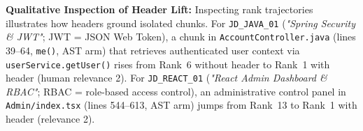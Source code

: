 \textbf{Qualitative Inspection of Header Lift:} Inspecting rank trajectories illustrates how headers ground isolated chunks. 
For \texttt{JD\_JAVA\_01} (\textit{"Spring Security \& JWT"}; JWT = JSON Web Token), a chunk in \texttt{AccountController.java} (lines 39--64, \texttt{me()}, AST arm) that retrieves authenticated user context via \texttt{userService.getUser()} rises from Rank~6 without header to Rank~1 with header (human relevance 2). 
For \texttt{JD\_REACT\_01} (\textit{"React Admin Dashboard \& RBAC"}; RBAC = role-based access control), an administrative control panel in \texttt{Admin/index.tsx} (lines 544--613, AST arm) jumps from Rank~13 to Rank~1 with header (relevance 2).
